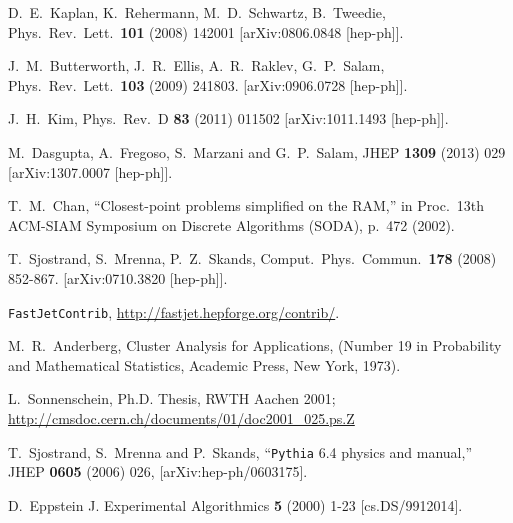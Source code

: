 \documentclass[12pt,a4]{article}
\newcommand{\fastjet}{\texttt{FastJet}\xspace}
\newcommand{\contrib}{\texttt{Contrib}\xspace}
\begin{document}
\begin{thebibliography}{99}
  D.~E.~Kaplan, K.~Rehermann, M.~D.~Schwartz, B.~Tweedie,
  Phys.\ Rev.\ Lett.\  {\bf 101 } (2008)  142001
  [arXiv:0806.0848 [hep-ph]].

  J.~M.~Butterworth, J.~R.~Ellis, A.~R.~Raklev, G.~P.~Salam,
  Phys.\ Rev.\ Lett.\  {\bf 103 } (2009)  241803.
  [arXiv:0906.0728 [hep-ph]].

  J.~H.~Kim,
  Phys.\ Rev.\  D {\bf 83} (2011) 011502
  [arXiv:1011.1493 [hep-ph]].


  M.~Dasgupta, A.~Fregoso, S.~Marzani and G.~P.~Salam,
  JHEP {\bf 1309} (2013) 029
  [arXiv:1307.0007 [hep-ph]].


  T.~M.~Chan,
  ``Closest-point problems simplified on the RAM,''
  in Proc.\ 13th ACM-SIAM Symposium on Discrete Algorithms (SODA),
  p.~472 (2002).

  T.~Sjostrand, S.~Mrenna, P.~Z.~Skands,
  Comput.\ Phys.\ Commun.\  {\bf 178 } (2008)  852-867.
  [arXiv:0710.3820 [hep-ph]].

 \fastjet \contrib, \url{http://fastjet.hepforge.org/contrib/}.


  M.~R.~Anderberg, 
  Cluster Analysis for Applications,
  (Number 19 in Probability and Mathematical Statistics, Academic
  Press, New York, 1973).


  L.~Sonnenschein, Ph.D. Thesis, RWTH Aachen 2001; \\
  \url{http://cmsdoc.cern.ch/documents/01/doc2001_025.ps.Z}

  T.~Sjostrand, S.~Mrenna and P.~Skands,
  ``{\tt Pythia} 6.4 physics and manual,''
  JHEP {\bf 0605} (2006) 026,
  [arXiv:hep-ph/0603175].

  D.~Eppstein
  J. Experimental Algorithmics {\bf 5} (2000) 1-23 [cs.DS/9912014].


\end{thebibliography}
\end{document}
